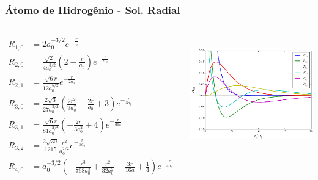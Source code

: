 \documentclass[12pt,brazil,table]{beamer}
\begin{document}
\begin{frame} 
  \frametitle{Átomo de Hidrogênio - Sol. Radial}
  \fontsize{8pt}{11pt}\selectfont
  
  \vspace*{-1cm}
    
    \begin{columns}[T]
    
    
    \begin{align*}
            R_{1,0} &=  2 a_0^{-3/2}e^{- \frac{r}{a_0}} \\
            R_{2,0} &=  \frac{\sqrt{2}}{4a_0^{3/2}} \left(2 - \frac{r}{a_0}\right) e^{- \frac{r}{2a_0}} \\
            R_{2,1} &=  \frac{\sqrt{6} r}{12a_0^{5/2}} e^{- \frac{r}{2a_0}} \\
            R_{3,0} &=  \frac{2 \sqrt{3}}{27a_0^{3/2}} \left(\frac{2 r^{2}}{9a_0^2} - \frac{2r}{a_0} + 3\right) e^{- \frac{r}{3a_0}} \\
            R_{3,1} &=  \frac{\sqrt{6} r}{81a_0^{3/2}} \left(- \frac{2 r}{3a_0^2} + 4\right) e^{- \frac{r}{3a_0}} \\
            R_{3,2} &=  \frac{2 \sqrt{30}}{1215} \frac{r^2}{a_0^{7/2}} e^{- \frac{r}{3a_0}} \\
            R_{4,0} &=  a_0^{-3/2}\left(- \frac{r^{3}}{768a_0^3} + \frac{r^{2}}{32a_0^2} - \frac{3 r}{16a} + \frac{1}{4}\right) e^{- \frac{r}{4a_0}} 
          \end{align*}

    
    
    
    
    \begin{center}
     \hspace*{-2cm} \includegraphics[height=5cm]{figuras/fig43}
    \end{center}
    
    \end{columns}
          
  \end{frame}
  
\end{document}
